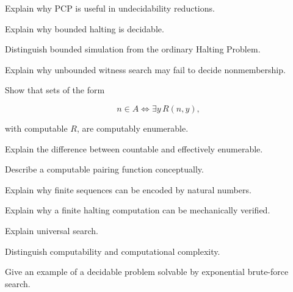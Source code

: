 \begin{exercise}[3]
Explain why PCP is useful in undecidability reductions.
\end{exercise}

\begin{exercise}[2]
Explain why bounded halting is decidable.
\end{exercise}

\begin{exercise}[3]
Distinguish bounded simulation from the ordinary Halting Problem.
\end{exercise}

\begin{exercise}[3]
Explain why unbounded witness search may fail to decide nonmembership.
\end{exercise}

\begin{exercise}[3]
Show that sets of the form

\[
n\in A
\iff
\exists y\,R(n,y),
\]

with computable \(R\), are computably enumerable.
\end{exercise}

\begin{exercise}[3]
Explain the difference between countable and effectively enumerable.
\end{exercise}

\begin{exercise}[2]
Describe a computable pairing function conceptually.
\end{exercise}

\begin{exercise}[3]
Explain why finite sequences can be encoded by natural numbers.
\end{exercise}

\begin{exercise}[3]
Explain why a finite halting computation can be mechanically verified.
\end{exercise}

\begin{exercise}[3]
Explain universal search.
\end{exercise}

\begin{exercise}[2]
Distinguish computability and computational complexity.
\end{exercise}

\begin{exercise}[3]
Give an example of a decidable problem solvable by exponential brute-force
search.
\end{exercise}

